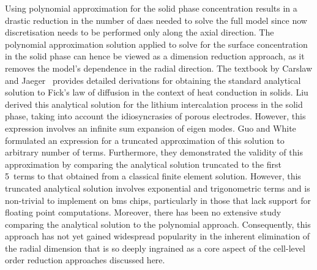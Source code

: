 Using polynomial  approximation for the  solid phase concentration results  in a
drastic reduction  in the number of  \glspl{dae} needed to solve  the full model
since now discretisation  needs to be performed only along  the axial direction.
The  polynomial  approximation  solution  applied   to  solve  for  the  surface
concentration in  the solid phase can  hence be viewed as  a dimension reduction
approach, as  it removes  the model's  dependence in  the radial  direction. The
textbook by Carslaw and  Jaeger~\cite{Carslaw1947} provides detailed derivations
for obtaining the standard analytical solution to Fick's law of diffusion in the
context of heat conduction in solids. Liu~\cite{Liu2006} derived this analytical
solution for the  lithium intercalation process in the solid  phase, taking into
account  the idiosyncrasies  of porous  electrodes.
However, this  expression involves an  infinite sum
expansion of eigen modes. Guo  and White~\cite{Guo2012} formulated an expression
for a  truncated approximation of  this solution  to arbitrary number  of terms.
Furthermore, they demonstrated  the validity of this  approximation by comparing
the analytical solution truncated  to the first 5~terms to  that obtained from a
classical finite  element solution. However, this  truncated analytical solution
involves exponential and trigonometric terms  and is non-trivial to implement on
\gls{bms}  chips, particularly  in those  that lack  support for  floating point
computations.  Moreover,  there  has  been  no  extensive  study  comparing  the
analytical solution to the polynomial  approach. Consequently, this approach has
not yet gained  widespread popularity in the inherent elimination  of the radial
dimension that is so  deeply ingrained as a core aspect  of the cell-level order
reduction  approaches  discussed  here.



